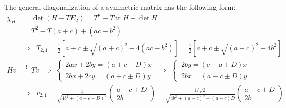 \documentclass[a4paper,12pt]{article}
\begin{document}
The general diagonalization of a symmetric matrix has the following form:
\begin{align*}
\chi_H&=\det (H-TE_2)=T^2-T\,\textrm{tr }H-\det H=\\
&=T^2-T(a+c)+(ac-b^2)=\\
&\Rightarrow\ \ T_{2,1}=\frac{1}{2}\left[a+c\pm\sqrt{(a+c)^2-4(ac-b^2)}\right]=\frac{1}{2}\left[a+c\pm\sqrt{(a-c)^2+4b^2}\right]\\
Hv&\overset{!}{=}Tv\ \ \Rightarrow\ \ \left\{\begin{matrix}
2ax+2by=(a+c\pm D)x\\2bx+2cy=(a+c\pm D)y
\end{matrix}\right.\ \ \Rightarrow\ \ \left\{\begin{matrix}
2by=(c-a\pm D)x\\2bx=(a-c\pm D)y
\end{matrix}\right.\\
&\Rightarrow\ \ v_{2,1}=\frac{1}{\sqrt{4b^2+(a-c\pm D)^2}}\begin{pmatrix}
a-c\pm D\\2b
\end{pmatrix}=\frac{1/\sqrt{2}}{\sqrt{4b^2+(a-c)^2\pm (a-c)D}}\begin{pmatrix}
a-c\pm D\\2b
\end{pmatrix}
\end{align*}
\end{document}
